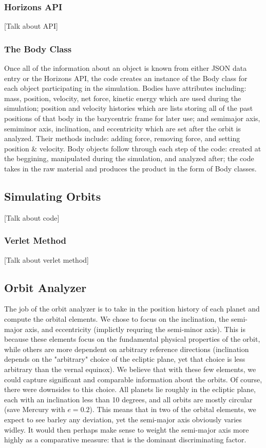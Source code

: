 \documentclass[a4paper,12pt]{article} %
\numberwithin{equation}{section} %
\numberwithin{figure}{section} %
\begin{document}
\subsubsection{Horizons API \cite{Horizons}}
\label{sec:API}

[Talk about API]

\subsubsection{The Body Class}
Once all of the information about an object is known from either JSON data entry or the Horizons API, the code creates an instance of the Body class for each object participating in the simulation. Bodies have attributes including: mass, position, velocity, net force, kinetic energy which are used during the simulation; position and velocity histories which are lists storing all of the past positions of that body in the barycentric frame for later use; and semimajor axis, semiminor axis, inclination, and eccentricity which are set after the orbit is analyzed. Their methods include: adding force, removing force, and setting position \& velocity. Body objects follow through each step of the code: created at the beggining, manipulated during the simulation, and analyzed after; the code takes in the raw material and produces the product in the form of Body classes.

\subsection{Simulating Orbits}
[Talk about code]

\subsubsection{Verlet Method}
[Talk about verlet method]

\subsection{Orbit Analyzer}

The job of the orbit analyzer is to take in the position history of each planet and compute the orbital elements. We chose to focus on the inclination, the semi-major axis, and eccentricity (implictly requring the semi-minor axis). This is because these elements focus on the fundamental physical properties of the orbit, while others are more dependent on arbitrary reference directions (inclination depends on the "arbitrary" choice of the ecliptic plane, yet that choice is less arbitrary than the vernal equinox). We believe that with these few elements, we could capture significant and comparable information about the orbits. Of course, there were downsides to this choice. All planets lie roughly in the ecliptic plane, each with an inclination less than 10 degrees, and all orbits are mostly circular (save Mercury with $e=0.2$). This means that in two of the orbital elements, we expect to see barley any deviation, yet the semi-major axis obviously varies widley. It would then perhaps make sense to weight the semi-major axis more highly as a comparative measure: that is the dominant discriminating factor.
\end{document}
